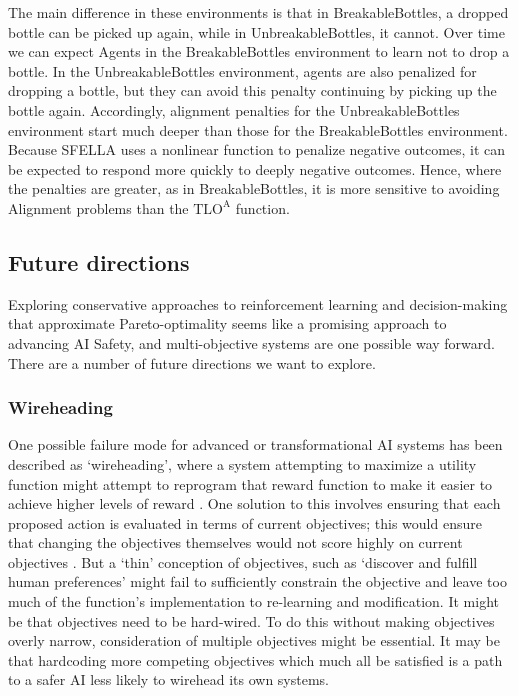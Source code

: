 The main difference in these environments is that in BreakableBottles, a dropped bottle can be picked up again, while in UnbreakableBottles, it cannot. Over time we can expect Agents in the BreakableBottles environment to learn not to drop a bottle. In the UnbreakableBottles environment, agents are also penalized for dropping a bottle, but they can avoid this penalty continuing by picking up the bottle again. Accordingly, alignment penalties for the UnbreakableBottles environment start much deeper than those for the BreakableBottles environment. Because SFELLA uses a nonlinear function to penalize negative outcomes, it can be expected to respond more quickly to deeply negative outcomes. Hence, where the penalties are greater, as in BreakableBottles, it is more sensitive to avoiding Alignment problems than the $\text{TLO}^\text{A}$ function.




\subsection{Future directions}

Exploring conservative approaches to reinforcement learning and decision-making that approximate Pareto-optimality seems like a promising approach to advancing AI Safety, and multi-objective systems are one possible way forward. There are a number of future directions we want to explore.


\subsubsection{Wireheading}

One possible failure mode for advanced or transformational AI systems has been described as `wireheading', where a system attempting to maximize a utility function might attempt to reprogram that reward function to make it easier to achieve higher levels of reward \cite{demski_a_stable_2017}. One solution to this involves ensuring that each proposed action is evaluated in terms of current objectives; this would ensure that changing the objectives themselves would not score highly on current objectives \cite{dewey_learning_2011}. But a `thin' conception of objectives, such as `discover and fulfill human preferences' might fail to sufficiently constrain the objective and leave too much of the function's implementation to re-learning and modification. It might be that objectives need to be hard-wired. To do this without making objectives overly narrow, consideration of multiple objectives might be essential. It may be that hardcoding more competing objectives which much all be satisfied is a path to a safer AI less likely to wirehead its own systems.


